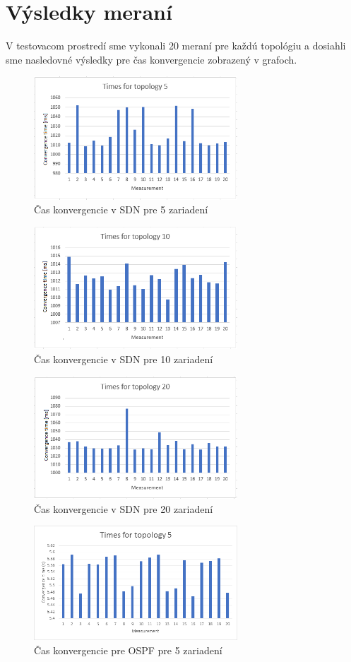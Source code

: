 \documentclass[conference]{IEEEtran}
\begin{document}
\section{Výsledky meraní}

V testovacom prostredí sme vykonali 20 meraní pre každú topológiu a dosiahli sme nasledovné výsledky pre čas konvergencie zobrazený v grafoch.

\begin{figure}[h!]
\centering
\includegraphics[width=3in]{../img/graph5}
\caption{Čas konvergencie v SDN pre 5 zariadení}
\end{figure}

\begin{figure}[h!]
\centering
\includegraphics[width=3in]{../img/graph10}
\caption{Čas konvergencie v SDN pre 10 zariadení}
\end{figure}

\begin{figure}[h!]
\centering
\includegraphics[width=3in]{../img/graph20}
\caption{Čas konvergencie v SDN pre 20 zariadení}
\end{figure}

\begin{figure}[h!]
\centering
\includegraphics[width=3in]{../img/graph5ospf}
\caption{Čas konvergencie pre OSPF pre 5 zariadení}
\end{figure}
\end{document}
